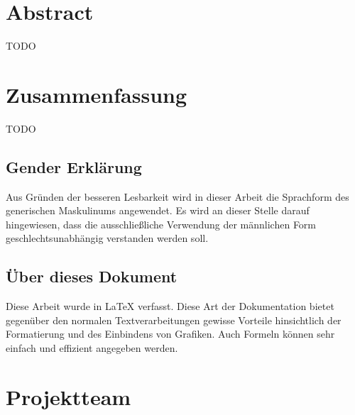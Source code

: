 \newpage
\thispagestyle{empty}
\mbox{}

\clearpage

\section*{Abstract}
\label{sec:abstract}
TODO

\section*{Zusammenfassung}
TODO

\clearpage

\newpage
\thispagestyle{empty}
\mbox{}

\clearpage

\subsection*{Gender Erklärung}
\label{sec:gender-erklaerung}
Aus Gründen der besseren Lesbarkeit wird in dieser Arbeit die Sprachform des generischen Maskulinums angewendet. Es wird an dieser Stelle darauf hingewiesen, dass die ausschließliche Verwendung der männlichen Form geschlechtsunabhängig verstanden werden soll.

\subsection*{Über dieses Dokument}
\label{sec:ueber-dokument}
Diese Arbeit wurde in \LaTeX{} verfasst. Diese Art der Dokumentation bietet gegenüber den normalen Textverarbeitungen gewisse Vorteile hinsichtlich der Formatierung und des Einbindens von Grafiken. Auch Formeln können sehr einfach und effizient angegeben werden.

\clearpage

\newpage
\thispagestyle{empty}
\mbox{}

\clearpage

\section*{Projektteam}
\label{sec:projektteam}

